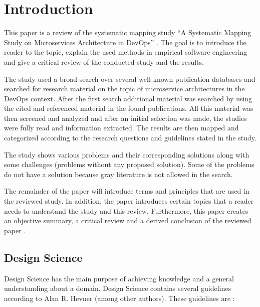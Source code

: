 \section{Introduction}
\label{sec:introduction}

This paper is a review of the systematic mapping study
``A Systematic Mapping Study on Microservices Architecture in DevOps'' \cite{waseem:SMSMSADevOps}.
The goal is to introduce the reader to the topic, explain the used
methods in empirical software engineering and give a critical review
of the conducted study and the results.

The study used a broad search over several well-known publication databases
and searched for research material on the topic of microservice architectures
in the DevOps context. After the first search additional material
was searched by using the cited and referenced material in the found publications. All this material
was then screened and analyzed and after an initial selection was made,
the studies were fully read and information extracted. The results
are then mapped and categorized according to the research questions
and guidelines stated in the study.

The study shows various problems and their corresponding solutions
along with some challenges (problems without any proposed solution).
Some of the problems do not have a solution because gray literature is
not allowed in the search.

The remainder of the paper will introduce terms and principles that are used
in the reviewed study. In addition, the paper introduces certain topics that a reader needs to understand
the study and this review. Furthermore, this paper creates an objective summary,
a critical review and a derived conclusion of the reviewed paper \cite{waseem:SMSMSADevOps}.

\subsection{Design Science}

Design Science has the main purpose of achieving knowledge and a general understanding
about a domain. Design Science contains several guidelines
according to Alan R. Hevner (among other authors). These guidelines are \cite{hevner:DesignScience}:

